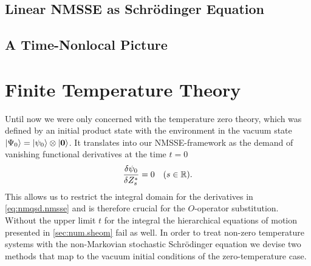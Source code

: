 \subsection{Linear NMSSE as Schrödinger Equation}
\label{sub:nmqsd.interpretation.unitary_view}

\subsection{A Time-Nonlocal Picture}
\label{sub:nmqsd.interpretation.time_osci}


\section{Finite Temperature Theory}
\label{sec:nmqsd.temperature}
%

Until now we were only concerned with the temperature zero theory, which was defined by an initial product state with the environment in the vacuum state $| \Psi_0 \rangle = | \psi_0 \rangle \otimes | \boldsymbol{0} \rangle$.
It translates into our NMSSE-framework as the demand of vanishing functional derivatives at the time $t = 0$
\begin{equation*}
  \frac{\delta \psi_0}{\delta {Z}^*_s} = 0 \quad (s \in \mathbb{R}).
\end{equation*}
This allows us to restrict the integral domain for the derivatives in \autoref{eq:nmqsd.nmsse} and is therefore crucial for the $O$-operator substitution.
Without the upper limit $t$ for the integral the hierarchical equations of motion presented in \autoref{sec:num.sheom} fail as well.
In order to treat non-zero temperature systems with the non-Markovian stochastic Schrödinger equation we devise two methods that map to the vacuum initial conditions of the zero-temperature case.

